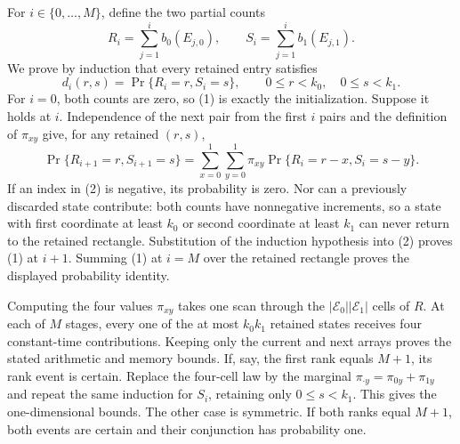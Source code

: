 For \(i\in\{0,\ldots,M\}\), define the two partial counts
\[
R_i=\sum_{j=1}^i b_0(E_{j,0}),\qquad S_i=\sum_{j=1}^i b_1(E_{j,1}).
\]
We prove by induction that every retained entry satisfies
\[
d_i(r,s)=\Pr\{R_i=r,S_i=s\},\qquad 0\le r<k_0,\quad 0\le s<k_1.
\tag{1}
\]
For \(i=0\), both counts are zero, so (1) is exactly the initialization. Suppose it holds at \(i\). Independence of the next pair from the first \(i\) pairs and the definition of \(\pi_{xy}\) give, for any retained \((r,s)\),
\[
\Pr\{R_{i+1}=r,S_{i+1}=s\}
=\sum_{x=0}^1\sum_{y=0}^1\pi_{xy}\Pr\{R_i=r-x,S_i=s-y\}.
\tag{2}
\]
If an index in (2) is negative, its probability is zero. Nor can a previously discarded state contribute: both counts have nonnegative increments, so a state with first coordinate at least \(k_0\) or second coordinate at least \(k_1\) can never return to the retained rectangle. Substitution of the induction hypothesis into (2) proves (1) at \(i+1\). Summing (1) at \(i=M\) over the retained rectangle proves the displayed probability identity.

Computing the four values \(\pi_{xy}\) takes one scan through the \(|\mathscr E_0||\mathscr E_1|\) cells of \(R\). At each of \(M\) stages, every one of the at most \(k_0k_1\) retained states receives four constant-time contributions. Keeping only the current and next arrays proves the stated arithmetic and memory bounds. If, say, the first rank equals \(M+1\), its rank event is certain. Replace the four-cell law by the marginal \(\pi_{\cdot y}=\pi_{0y}+\pi_{1y}\) and repeat the same induction for \(S_i\), retaining only \(0\le s<k_1\). This gives the one-dimensional bounds. The other case is symmetric. If both ranks equal \(M+1\), both events are certain and their conjunction has probability one.